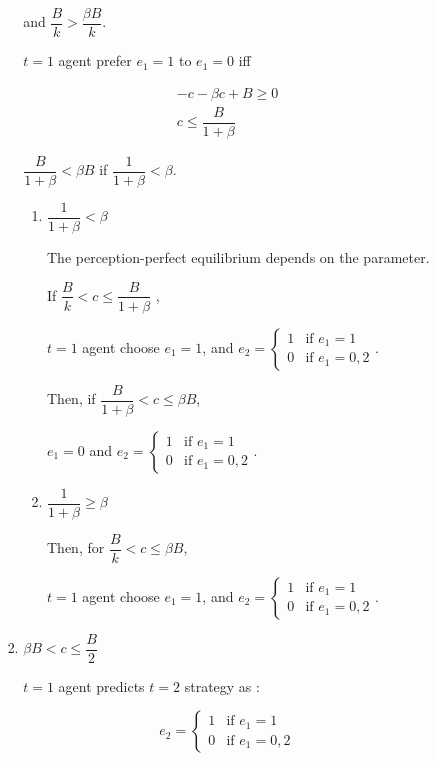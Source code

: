 \documentclass{jsarticle}
\begin{document}
\begin{enumerate}
\begin{enumerate}
\begin{itemize}
\begin{enumerate}
 and $ \dfrac{B}{k} > \dfrac{\beta B}{k}$.
 
 $t=1$ agent prefer $e_1=1$ to $e_1=0$ iff
 
  \begin{align*}
  -c - \beta c + B \geq 0 \\
  c \leq \dfrac{B}{1+\beta}
  \end{align*}
  
  $\dfrac{B}{1 + \beta} < \beta B$ if $\dfrac{1}{1 + \beta} < \beta$.
  
  \begin{enumerate}
  
  \item $\dfrac{1}{1 + \beta} < \beta$
  
  The perception-perfect equilibrium depends on the parameter.
  
  If $\dfrac{B}{k} < c \leq \dfrac{B}{1+\beta}$ ,
  
  $t=1$ agent choose $e_1=1$, and $e_2 = \begin{cases}
  1 & \text{if } e_1=1 \\
  0 & \text{if } e_1=0,2
  \end{cases}$.
  
  Then, if $\dfrac{B}{1+\beta} < c \leq \beta B$,
  
  $e_1=0$ and $e_2 = \begin{cases}
  1 & \text{if } e_1=1 \\
  0 & \text{if } e_1=0,2
  \end{cases}$.
  
  \item $\dfrac{1}{1 + \beta} \geq \beta$
  
  Then, for $\dfrac{B}{k} < c \leq \beta B$,
  
   $t=1$ agent choose $e_1=1$, and $e_2 = \begin{cases}
  1 & \text{if } e_1=1 \\
  0 & \text{if } e_1=0,2
  \end{cases}$.
 
  
  \end{enumerate}
 
 \newpage
 
 \item $\beta B < c \leq \dfrac{B}{2}$
 
 $t=1$ agent predicts $t=2$ strategy as :
 
  \[e_2 = \begin{cases}
  1 & \text{if } e_1=1 \\
 0 & \text{if } e_1=0,2
 \end{cases} \]
 

\end{enumerate}
\end{itemize}
\end{enumerate}
\end{enumerate}
\end{document}
